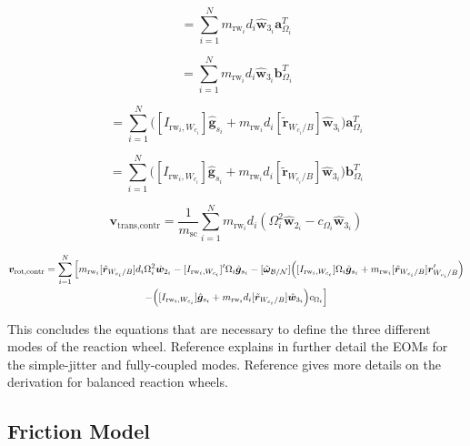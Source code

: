 \begin{equation}
[A_\text{contr}] = \sum\limits_{i=1}^{N}m_{\text{rw}_i}d_i\hat{\bm{w}}_{3_i}\bm{a}_{\Omega_i}^T
\end{equation}

\begin{equation}
[B_\text{contr}] = \sum\limits_{i=1}^{N}m_{\text{rw}_i}d_i\hat{\bm{w}}_{3_i}\bm{b}_{\Omega_i}^T
\end{equation}

\begin{equation}
[C_\text{contr}] = \sum\limits_{i=1}^{N}\Big([I_{\text{rw}_i,W_{c_i}}]\hat{\bm{g}}_{s_i} + m_{\text{rw}_i}d_i[\tilde{\bm{r}}_{W_{c_i}/B}]\hat{\bm{w}}_{3_i}\Big)\bm{a}_{\Omega_i}^T
\end{equation}

\begin{equation}
[D_\text{contr}] = \sum\limits_{i=1}^{N}\Big([I_{\text{rw}_i,W_{c_i}}]\hat{\bm{g}}_{s_i} + m_{\text{rw}_i}d_i[\tilde{\bm{r}}_{W_{c_i}/B}]\hat{\bm{w}}_{3_i}\Big)\bm{b}_{\Omega_i}^T
\end{equation}

\begin{equation}
\bm{v}_\text{trans,contr} = \frac{1}{m_{\text{sc}}}\sum\limits_{i=1}^{N}m_{\text{rw}_i}d_i\left(\Omega_i^2\hat{\bm{w}}_{2_i}-c_{\Omega_i}\hat{\bm{w}}_{3_i}\right)
\end{equation}

\begin{multline}
\bm{v}_\text{rot,contr} = \sum\limits_{i=1}^{N} \Big[ m_{\text{rw}_i}[\tilde{\bm{r}}_{W_{c_i}/B}]d_i \Omega_i^2\hat{\bm{w}}_{2_i}-[I_{\text{rw}_i,W_{c_i}}]'\Omega_i \hat{\bm{g}}_{s_i} -[\tilde{\bm\omega}_{\cal B/N}]\Big([I_{\text{rw}_i,W_{c_i}}]\Omega_i \hat{\bm{g}}_{s_i}+ m_{\text{rw}_i}[\tilde{\bm{r}}_{W_{c_i}/B}]\bm{r}'_{W_{c_i}/B}\Big) \\ 
-\Big([I_{\text{rw}_i,W_{c_i}}]\hat{\bm{g}}_{s_i} + m_{\text{rw}_i}d_i[\tilde{\bm{r}}_{W_{c_i}/B}]\hat{\bm{w}}_{3_i}\Big)c_{\Omega_i} \Big]
\end{multline}

This concludes the equations that are necessary to define the three different modes of the reaction wheel. Reference\cite{Alcorn:2016yq} explains in further detail the EOMs for the simple-jitter and fully-coupled modes. Reference\cite{schaub} gives more details on the derivation for balanced reaction wheels.

\subsection{Friction Model}
\label{sec:Friction}

